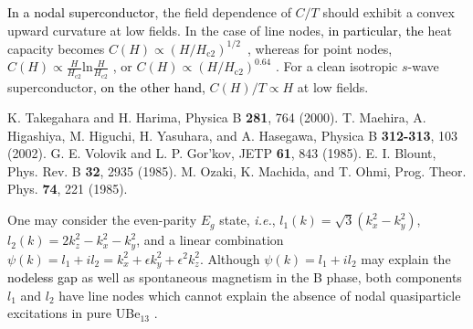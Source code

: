 \documentclass[twocolumn, prl]{revtex4}%
\newcommand{\correct}[1]{\textcolor{black}{#1}}
\begin{document}
\begin{thebibliography}{99}
\correct{In a nodal superconductor},  the field dependence of $C/T$ should exhibit a convex upward curvature at low fields. In the case of line nodes, \correct{in particular, the} heat capacity becomes  $C(H) \propto (H/H_{\mathrm{c2} })^{1/2}$~\cite{Volovik_JETP_Lett_1993, Vekhter_PRBR_1999, Sakakibara_ROPP_2016}, 
  whereas for point nodes, $C(H) \propto \frac{H}{H_{\mathrm{c2} } } \mathrm{ln} \frac{H}{H_{\mathrm{c2} } } $ 
 \cite{Volovik_JPhysC_21_1988},  or $C(H) \propto (H/H_{\mathrm{c2} })^{0.64}$ 
 \cite{Miranovic_PRB_2003}.
For a clean isotropic $s$-wave superconductor, \correct{on the other hand,} $C(H)/T \propto H$  at low fields.





 K. Takegahara and H. Harima, Physica B {\bf281}, 764 (2000).
 T. Maehira, A. Higashiya, M. Higuchi, H. Yasuhara, and A. Hasegawa, Physica B {\bf312-313}, 103 (2002).
 G. E. Volovik and L. P. Gor'kov, JETP {\bf61}, 843 (1985).
 E. I. Blount, Phys. Rev. B {\bf32}, 2935 (1985).
 M. Ozaki, K. Machida, and T. Ohmi, Prog. Theor. Phys. {\bf74}, 221 (1985).




 One may consider  the even-parity $E_{g}$ state, \textit{i.e.},
  $ l_{1} (k) = \sqrt{3} ( k^2_{x} -  k^2_{y} )$,  $ l_{2} (k) = 2  k^2_{z} -  k^2_{x}  -  k^2_{y}  $, 
 and a linear combination  $ \psi (k) = l_{1} + i l_{2} =   k^2_{x} + \epsilon  k^2_{y} +  \epsilon^2  k^2_{z} $. 
Although $ \psi (k) = l_{1} + i l_{2} $  may  explain the \correct{nodeless gap} as well as spontaneous magnetism in the B phase, 
   both components  ${l}_{1}$ and ${l}_{2} $  have line nodes which cannot explain the absence of nodal quasiparticle excitations in  pure UBe$_{13}$ 
 \cite{YShimizu_PRL_2015}.
 







\end{thebibliography}
\end{document}
